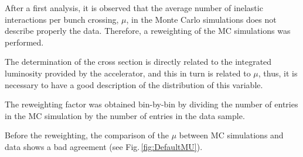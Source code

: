\documentclass[12pt, twoside]{article}
\numberwithin{equation}{section}
\numberwithin{figure}{section}
\begin{document}
After a first analysis, it is observed that the average number of inelastic interactions per bunch crossing, $\mu$, in the Monte Carlo simulations does not describe properly the data. Therefore, a reweighting of the MC simulations was performed.

The determination of the cross section is directly related to the integrated luminosity provided by the accelerator, and this in turn is related to $\mu$, thus, it is necessary to have a good description of the distribution of this variable.

The reweighting factor was obtained bin-by-bin by dividing the number of entries in the MC simulation by the number of entries in the data sample.

Before the reweighting, the comparison of the $\mu$ between MC simulations and data shows a bad agreement (see Fig.\,\ref{fig:DefaultMU}).
\end{document}
